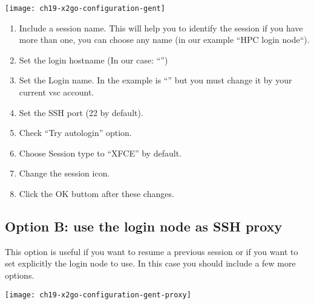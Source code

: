 \begin{center}
\texttt{[image: ch19-x2go-configuration-gent]}
\end{center}

\begin{enumerate}
    \item  Include a session name. This will help you to identify 
    the session if you have more than one, you can choose any name (in our example ``HPC login node``).
    \item  Set the login hostname (In our case: ``\strong{\emph{\loginnode}}'')
    \item  Set the Login name. In the example is ``'' but you must change it by your
    current vsc account.
    \item  Set the SSH port (22 by default).
    \item  Check ``Try autologin'' option.
    \item  Choose Session type to ``XFCE'' by default.
    \item  \strong{[optional]:} Change the session icon.
    \item  Click the OK buttom after these changes.
\end{enumerate}

\subsection{Option B: use the login node as SSH proxy}
This option is useful if you want to resume a previous session or if you want to set explicitly the login node to use.
In this case you should include a few more options.

\begin{center}
\texttt{[image: ch19-x2go-configuration-gent-proxy]}
\end{center}

